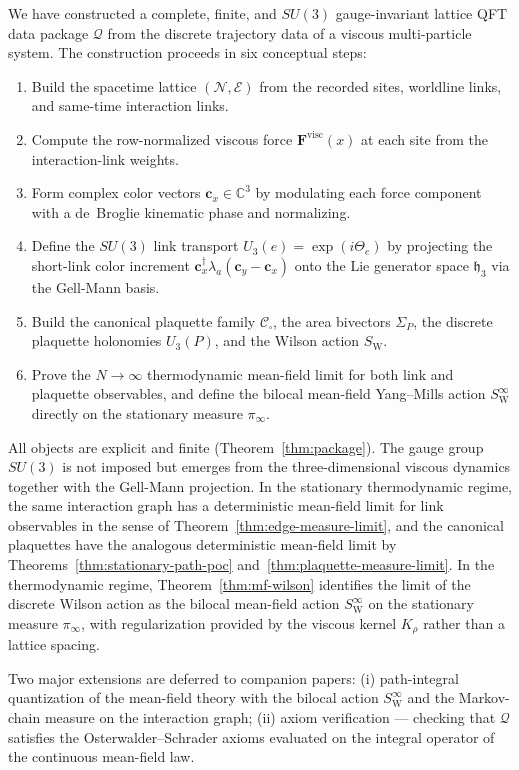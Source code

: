 \documentclass[11pt]{article}
\theoremstyle{remark}
\newcommand{\C}{\mathbb C}
\newcommand{\mcN}{\mathcal N}
\newcommand{\mcE}{\mathcal E}
\newcommand{\mathfrakh}{\mathfrak h_3}
\begin{document}
We have constructed a complete, finite, and $SU(3)$ gauge-invariant lattice QFT
data package $\mathcal Q$ from the discrete trajectory data of a viscous
multi-particle system.
The construction proceeds in six conceptual steps:
\begin{enumerate}[leftmargin=1.5em]
\item Build the spacetime lattice $(\mcN,\mcE)$ from the recorded sites,
      worldline links, and same-time interaction links.
\item Compute the row-normalized viscous force $\mathbf F^{\mathrm{visc}}(x)$
      at each site from the interaction-link weights.
\item Form complex color vectors $\mathbf c_x\in\C^3$ by modulating each force
      component with a de~Broglie kinematic phase and normalizing.
\item Define the $SU(3)$ link transport $U_3(e)=\exp(i\Theta_e)$ by projecting
      the short-link color increment
      $\mathbf c_x^\dagger\lambda_a(\mathbf c_y-\mathbf c_x)$ onto the Lie
      generator space $\mathfrakh$ via the Gell-Mann basis.
\item Build the canonical plaquette family $\mathcal C_\square$, the area
      bivectors $\Sigma_P$, the discrete plaquette holonomies $U_3(P)$, and
      the Wilson action $S_{\mathrm W}$.
\item Prove the $N\to\infty$ thermodynamic mean-field limit for both link and
      plaquette observables, and define the bilocal mean-field Yang--Mills action
      $S_{\mathrm W}^\infty$ directly on the stationary measure $\pi_\infty$.
\end{enumerate}
All objects are explicit and finite (Theorem~\ref{thm:package}).
The gauge group $SU(3)$ is not imposed but emerges from the three-dimensional
viscous dynamics together with the Gell-Mann projection.
In the stationary thermodynamic regime, the same interaction graph has a
deterministic mean-field limit for link observables in the sense of
Theorem~\ref{thm:edge-measure-limit}, and the canonical plaquettes have the
analogous deterministic mean-field limit by
Theorems~\ref{thm:stationary-path-poc} and~\ref{thm:plaquette-measure-limit}.
In the thermodynamic regime, Theorem~\ref{thm:mf-wilson} identifies the limit of
the discrete Wilson action as the bilocal mean-field action $S_{\mathrm W}^\infty$
on the stationary measure $\pi_\infty$, with regularization provided by the
viscous kernel $K_\rho$ rather than a lattice spacing.

Two major extensions are deferred to companion papers:
(i) path-integral quantization of the mean-field theory with the bilocal action
$S_{\mathrm W}^\infty$ and the Markov-chain measure on the interaction graph;
(ii) axiom verification --- checking that $\mathcal Q$ satisfies the
Osterwalder--Schrader axioms evaluated on the integral operator of the continuous
mean-field law.



\end{document}
